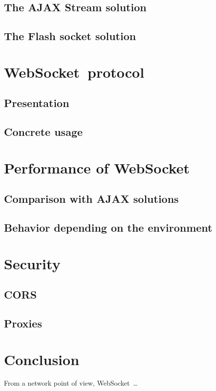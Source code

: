 \documentclass[journal,compsoc]{IEEEtran}
\newcommand{\ws}{WebSocket~}
\begin{document}
\subsection{The AJAX Stream solution}

\subsection{The Flash socket solution}

\section{\ws protocol}

\subsection{Presentation}

\subsection{Concrete usage}

\section{Performance of \ws}

\subsection{Comparison with AJAX solutions}

\subsection{Behavior depending on the environment}

\section{Security}

\subsection{CORS}

\subsection{Proxies}

\section{Conclusion}

From a network point of view, \ws …


\ifCLASSOPTIONcaptionsoff
  \newpage
\fi




\end{document}
